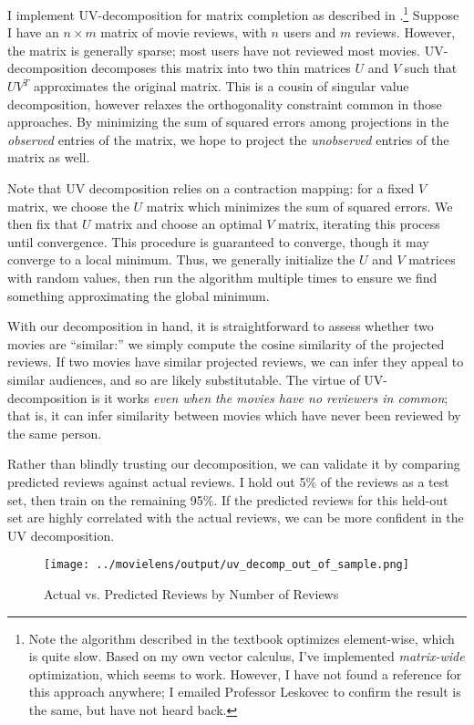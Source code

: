 \documentclass{article}
\begin{document}
I implement UV-decomposition for matrix completion as described in \textcite{leskovec2020MMD}.\footnote{Note the algorithm described in the textbook optimizes element-wise, which is quite slow. Based on my own vector calculus, I've implemented \emph{matrix-wide} optimization, which seems to work. However, I have not found a reference for this approach anywhere; I emailed Professor Leskovec to confirm the result is the same, but have not heard back.} Suppose I have an $n \times m$ matrix of movie reviews, with $n$ users and $m$ reviews. However, the matrix is generally sparse; most users have not reviewed most movies. UV-decomposition decomposes this matrix into two thin matrices $U$ and $V$ such that $UV^T$ approximates the original matrix. This is a cousin of singular value decomposition, however relaxes the orthogonality constraint common in those approaches. By minimizing the sum of squared errors among projections in the \emph{observed} entries of the matrix, we hope to project the \emph{unobserved} entries of the matrix as well. 

Note that UV decomposition relies on a contraction mapping: for a fixed $V$ matrix, we choose the $U$ matrix which minimizes the sum of squared errors. We then fix that $U$ matrix and choose an optimal $V$ matrix, iterating this process until convergence. This procedure is guaranteed to converge, though it may converge to a local minimum. Thus, we generally initialize the $U$ and $V$ matrices with random values, then run the algorithm multiple times to ensure we find something approximating the global minimum. 

With our decomposition in hand, it is straightforward to assess whether two movies are ``similar:'' we simply compute the cosine similarity of the projected reviews. If two movies have similar projected reviews, we can infer they appeal to similar audiences, and so are likely substitutable. The virtue of UV-decomposition is it works \emph{even when the movies have no reviewers in common}; that is, it can infer similarity between movies which have never been reviewed by the same person.

Rather than blindly trusting our decomposition, we can validate it by comparing predicted reviews against actual reviews. I hold out 5\% of the reviews as a test set, then train on the remaining 95\%. If the predicted reviews for this held-out set are highly correlated with the actual reviews, we can be more confident in the UV decomposition.

\begin{figure}
    \begin{center}
    \texttt{[image: ../movielens/output/uv\_decomp\_out\_of\_sample.png]}
    \caption{Actual vs. Predicted Reviews by Number of Reviews}
    \label{fig:actual_vs_predicted}
    \end{center}
\end{figure}
\end{document}
